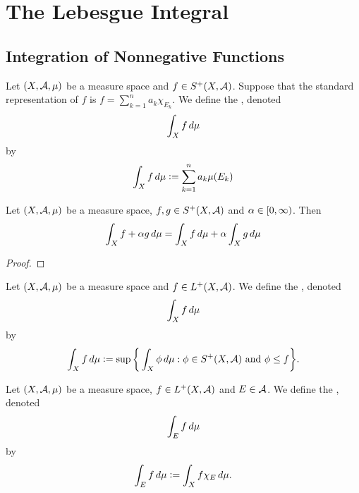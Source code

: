 \documentclass{book}
\begin{document}
	
	
	
	
	
	
	
	
	
	
	
	
	
	
	
	
	\newpage
	\chapter{The Lebesgue Integral}
	
	\section{Integration of Nonnegative Functions}

	\begin{defn} 
		Let $(X, \mathcal{A}, \mu)$ be a measure space and $f \in S^+(X, \mathcal{A})$. Suppose that the standard representation of $f$ is $f = \sum\limits_{k=1}^n a_k \chi_{E_k}$. We define the , denoted 
		$$\int_X f \, d \mu$$
		by 
		$$\int_X f \, d \mu \vcentcolon= \sum_{k=1}^n a_k \mu(E_k)$$
	\end{defn}

	\begin{ex} 
		Let $(X, \mathcal{A}, \mu)$ be a measure space, $f,g \in S^+(X, \mathcal{A})$ and $\alpha \in [0,\infty)$. Then  
		$$\int_X f + \alpha g \, d \mu = \int_X f \, d \mu + \alpha \int_X g \, d \mu$$
	\end{ex}

	\begin{proof}
	\end{proof}

	\begin{defn} 
		Let $(X, \mathcal{A}, \mu)$ be a measure space and $f \in L^+(X, \mathcal{A})$. We define the , denoted 
		$$\int_X f \, d \mu$$
		by 
		$$\int_X f \, d \mu \vcentcolon= \sup \bigg \{ \int_X \phi \, d \mu: \phi \in S^+(X, \mathcal{A}) \text{ and } \phi \leq f \bigg\}.$$
	\end{defn}

	\begin{ex}
	\end{ex}

	\begin{defn} 
		Let $(X, \mathcal{A}, \mu)$ be a measure space, $f \in L^+(X, \mathcal{A})$ and $E \in \mathcal{A}$. We define the , denoted 
		$$\int_E f \, d \mu$$
		by 
		$$\int_E f \, d \mu \vcentcolon= \int_X f \chi_E \, d \mu.$$
	\end{defn}
\end{document}
